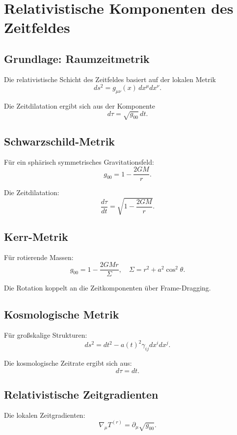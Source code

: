 
\section{Relativistische Komponenten des Zeitfeldes}

\subsection{Grundlage: Raumzeitmetrik}

Die relativistische Schicht des Zeitfeldes basiert auf der lokalen Metrik
\[
ds^2 = g_{\mu\nu}(x) \, dx^\mu dx^\nu.
\]

Die Zeitdilatation ergibt sich aus der Komponente
\[
d\tau = \sqrt{g_{00}} \, dt.
\]

\subsection{Schwarzschild-Metrik}

Für ein sphärisch symmetrisches Gravitationsfeld:
\[
g_{00} = 1 - \frac{2GM}{r}.
\]

Die Zeitdilatation:
\[
\frac{d\tau}{dt} = \sqrt{1 - \frac{2GM}{r}}.
\]

\subsection{Kerr-Metrik}

Für rotierende Massen:
\[
g_{00} = 1 - \frac{2GMr}{\Sigma},
\quad
\Sigma = r^2 + a^2 \cos^2\theta.
\]

Die Rotation koppelt an die Zeitkomponenten über Frame-Dragging.

\subsection{Kosmologische Metrik}

Für großskalige Strukturen:
\[
ds^2 = dt^2 - a(t)^2 \gamma_{ij} dx^i dx^j.
\]

Die kosmologische Zeitrate ergibt sich aus:
\[
d\tau = dt.
\]

\subsection{Relativistische Zeitgradienten}

Die lokalen Zeitgradienten:
\[
\nabla_\mu T^{(r)} = \partial_\mu \sqrt{g_{00}}.
\]


